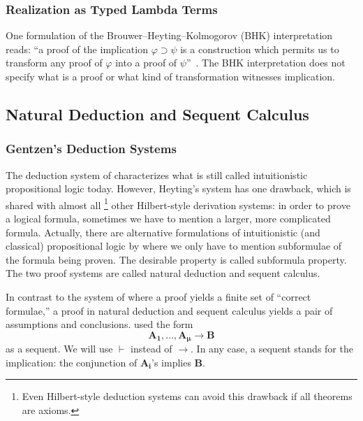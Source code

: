 \subsubsection{Realization as Typed Lambda Terms}

One formulation of the
Brouwer--Heyting--Kolmogorov
(BHK)
interpretation reads: ``a proof of the
implication $\varphi\supset\psi$ is a construction which permits us to
 transform any proof of $\varphi$ into a proof of $\psi$''~\cite[Ch.~1, 3.1.]{troelstra1988constructivism}.
The BHK
interpretation does not specify what is a proof or what kind of
transformation witnesses implication.


\subsection{Natural Deduction and Sequent Calculus}

\subsubsection{Gentzen's Deduction Systems}

The deduction system of \citet{heyting1930} characterizes what is still
called intuitionistic propositional logic today. However, Heyting's
system has one drawback, which is shared with almost all%
\footnote{Even Hilbert-style deduction
systems can avoid this drawback if all theorems are axioms.} other
Hilbert-style derivation systems:
in order to prove a logical formula, sometimes we have to
mention a larger, more complicated formula.  Actually, there
are alternative formulations of intuitionistic (and classical)
propositional logic by \citet{gentzen} where we only have to
mention subformulae of the formula being proven.
The desirable property is called subformula property.
The two proof systems are called natural deduction and sequent calculus.

In contrast to the system of \citet{heyting1930} where a proof yields a
finite set of ``correct formulae,'' a proof in natural deduction and
sequent calculus yields a pair of assumptions and conclusions.
\citet{gentzen} used the form
\[
 \mathbf{A_1},\ldots,\mathbf{A_{\boldsymbol\mu}}\longrightarrow \mathbf{B}
\]
as a sequent.  We will use $\vdash$ instead of $\longrightarrow$.
In any case, a sequent stands for the implication:
the conjunction of $\mathbf{A_i}$'s implies $\mathbf{B}$.

